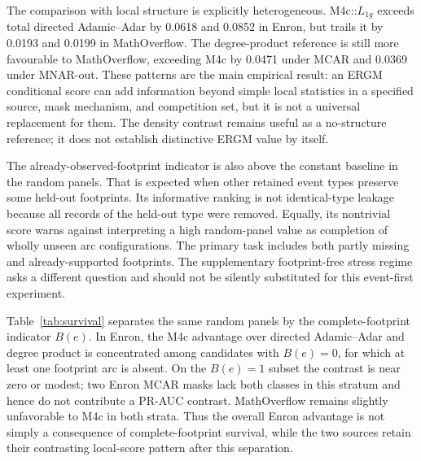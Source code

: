 \documentclass[10pt]{article}
\begin{document}
The comparison with local structure is explicitly heterogeneous. M4c::$L_{1g}$ exceeds total directed Adamic--Adar by 0.0618 and 0.0852 in Enron, but trails it by 0.0193 and 0.0199 in MathOverflow. The degree-product reference is still more favourable to MathOverflow, exceeding M4c by 0.0471 under MCAR and 0.0369 under MNAR-out. These patterns are the main empirical result: an ERGM conditional score can add information beyond simple local statistics in a specified source, mask mechanism, and competition set, but it is not a universal replacement for them. The density contrast remains useful as a no-structure reference; it does not establish distinctive ERGM value by itself.

The already-observed-footprint indicator is also above the constant baseline in the random panels. That is expected when other retained event types preserve some held-out footprints. Its informative ranking is not identical-type leakage because all records of the held-out type were removed. Equally, its nontrivial score warns against interpreting a high random-panel value as completion of wholly unseen arc configurations. The primary task includes both partly missing and already-supported footprints. The supplementary footprint-free stress regime asks a different question and should not be silently substituted for this event-first experiment.

Table~\ref{tab:survival} separates the same random panels by the complete-footprint indicator $B(e)$. In Enron, the M4c advantage over directed Adamic--Adar and degree product is concentrated among candidates with $B(e)=0$, for which at least one footprint arc is absent. On the $B(e)=1$ subset the contrast is near zero or modest; two Enron MCAR masks lack both classes in this stratum and hence do not contribute a PR-AUC contrast. MathOverflow remains slightly unfavorable to M4c in both strata. Thus the overall Enron advantage is not simply a consequence of complete-footprint survival, while the two sources retain their contrasting local-score pattern after this separation.
\end{document}
